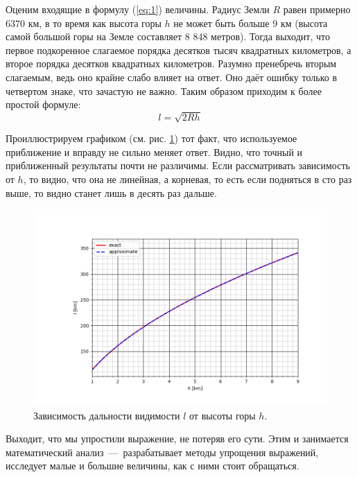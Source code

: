 \documentclass[a4paper,9pt,russian]{article}
\begin{document}
\par
Оценим входящие в формулу (\ref{eq:1}) величины. Радиус Земли $R$ равен примерно $6 370$ км, в то время как высота горы $h$ не может быть больше $9$ км (высота самой большой горы на Земле составляет 8 848 метров). Тогда выходит, что первое подкоренное слагаемое порядка десятков тысяч квадратных километров, а второе порядка десятков квадратных километров. Разумно пренебречь вторым слагаемым, ведь оно крайне слабо влияет на ответ. Оно даёт ошибку только в четвертом знаке, что зачастую не важно. Таким образом приходим к более простой формуле:
\begin{equation}
 l = \sqrt{2Rh}
\end{equation}

Проиллюстрируем графиком (см. рис. \ref{fig:2}) тот факт, что используемое приближение и вправду не сильно меняет ответ. Видно, что точный и приближенный результаты почти не различимы. Если рассматривать зависимость от $h$, то видно, что она не линейная, а корневая, то есть если подняться в сто раз выше, то видно станет лишь в десять раз дальше.

\begin{figure}[htb]
 \centering
 \includegraphics[width=130mm]{1.png}
 \caption{Зависимость дальности видимости $l$ от высоты горы $h$.}
 \label{fig:2}
\end{figure}

\par
Выходит, что мы упростили выражение, не потеряв его сути. Этим и занимается математический анализ~\----~разрабатывает методы упрощения выражений, исследует малые и большие величины, как с ними стоит обращаться.
\end{document}
